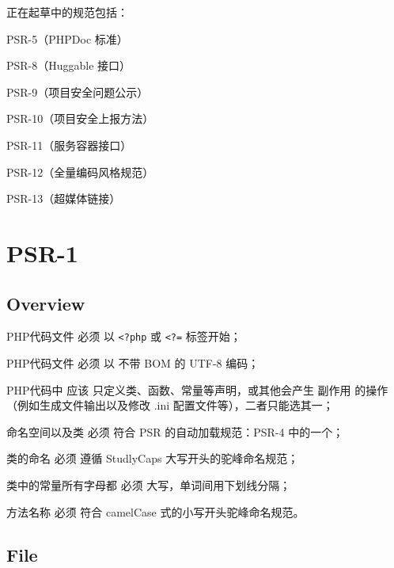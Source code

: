 正在起草中的规范包括：

\begin{compactitem}
\item PSR-5（PHPDoc 标准）
\item PSR-8（Huggable 接口）
\item PSR-9（项目安全问题公示）
\item PSR-10（项目安全上报方法）
\item PSR-11（服务容器接口）
\item PSR-12（全量编码风格规范）
\item PSR-13（超媒体链接）
\end{compactitem}


\chapter{PSR-1}


\section{Overview}

\begin{compactitem}
\item PHP代码文件 必须 以 \texttt{<?php} 或 \texttt{<?=} 标签开始；

\item PHP代码文件 必须 以 不带 BOM 的 UTF-8 编码；

\item PHP代码中 应该 只定义类、函数、常量等声明，或其他会产生 副作用 的操作（例如生成文件输出以及修改 .ini 配置文件等），二者只能选其一；

\item 命名空间以及类 必须 符合 PSR 的自动加载规范：PSR-4 中的一个；

\item 类的命名 必须 遵循 StudlyCaps 大写开头的驼峰命名规范；

\item 类中的常量所有字母都 必须 大写，单词间用下划线分隔；

\item 方法名称 必须 符合 camelCase 式的小写开头驼峰命名规范。

\end{compactitem}





\section{File}

